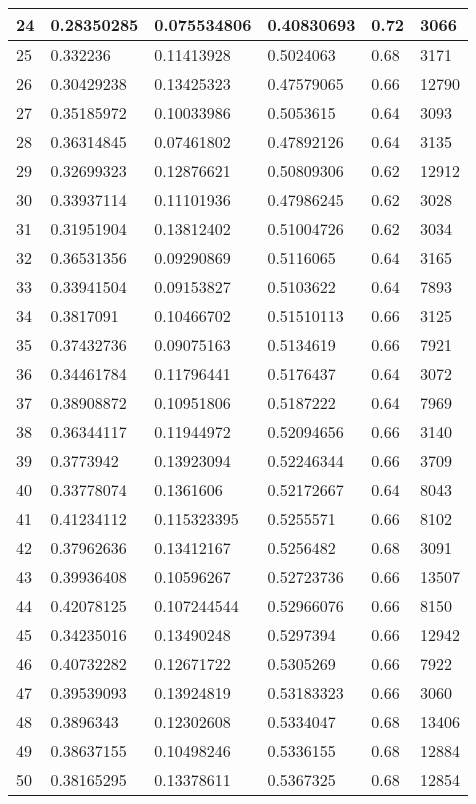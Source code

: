 \begin{longtable}{|l|l|l|l|l|l|}
24 & 0.28350285 & 0.075534806 & 0.40830693 & 0.72 & 3066 \\ \hline 
25 & 0.332236 & 0.11413928 & 0.5024063 & 0.68 & 3171 \\ \hline 
26 & 0.30429238 & 0.13425323 & 0.47579065 & 0.66 & 12790 \\ \hline 
27 & 0.35185972 & 0.10033986 & 0.5053615 & 0.64 & 3093 \\ \hline 
28 & 0.36314845 & 0.07461802 & 0.47892126 & 0.64 & 3135 \\ \hline 
29 & 0.32699323 & 0.12876621 & 0.50809306 & 0.62 & 12912 \\ \hline 
30 & 0.33937114 & 0.11101936 & 0.47986245 & 0.62 & 3028 \\ \hline 
31 & 0.31951904 & 0.13812402 & 0.51004726 & 0.62 & 3034 \\ \hline 
32 & 0.36531356 & 0.09290869 & 0.5116065 & 0.64 & 3165 \\ \hline 
33 & 0.33941504 & 0.09153827 & 0.5103622 & 0.64 & 7893 \\ \hline 
34 & 0.3817091 & 0.10466702 & 0.51510113 & 0.66 & 3125 \\ \hline 
35 & 0.37432736 & 0.09075163 & 0.5134619 & 0.66 & 7921 \\ \hline 
36 & 0.34461784 & 0.11796441 & 0.5176437 & 0.64 & 3072 \\ \hline 
37 & 0.38908872 & 0.10951806 & 0.5187222 & 0.64 & 7969 \\ \hline 
38 & 0.36344117 & 0.11944972 & 0.52094656 & 0.66 & 3140 \\ \hline 
39 & 0.3773942 & 0.13923094 & 0.52246344 & 0.66 & 3709 \\ \hline 
40 & 0.33778074 & 0.1361606 & 0.52172667 & 0.64 & 8043 \\ \hline 
41 & 0.41234112 & 0.115323395 & 0.5255571 & 0.66 & 8102 \\ \hline 
42 & 0.37962636 & 0.13412167 & 0.5256482 & 0.68 & 3091 \\ \hline 
43 & 0.39936408 & 0.10596267 & 0.52723736 & 0.66 & 13507 \\ \hline 
44 & 0.42078125 & 0.107244544 & 0.52966076 & 0.66 & 8150 \\ \hline 
45 & 0.34235016 & 0.13490248 & 0.5297394 & 0.66 & 12942 \\ \hline 
46 & 0.40732282 & 0.12671722 & 0.5305269 & 0.66 & 7922 \\ \hline 
47 & 0.39539093 & 0.13924819 & 0.53183323 & 0.66 & 3060 \\ \hline 
48 & 0.3896343 & 0.12302608 & 0.5334047 & 0.68 & 13406 \\ \hline 
49 & 0.38637155 & 0.10498246 & 0.5336155 & 0.68 & 12884 \\ \hline 
50 & 0.38165295 & 0.13378611 & 0.5367325 & 0.68 & 12854 \\ \hline 
\end{longtable}